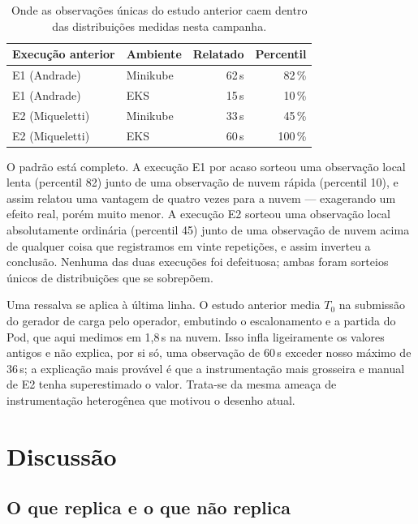 \documentclass[conference]{IEEEtran}
\begin{document}
\begin{table}[!t]
\centering
\caption{Onde as observações únicas do estudo anterior caem dentro das
distribuições medidas nesta campanha.}
\label{tab:percentis}
\footnotesize
\begin{tabular}{@{}llrr@{}}
\toprule
\textbf{Execução anterior} & \textbf{Ambiente} & \textbf{Relatado} & \textbf{Percentil}\\
\midrule
E1 (Andrade)    & Minikube & 62\,s & 82\,\%\\
E1 (Andrade)    & EKS      & 15\,s & 10\,\%\\
E2 (Miqueletti) & Minikube & 33\,s & 45\,\%\\
E2 (Miqueletti) & EKS      & 60\,s & 100\,\%\\
\bottomrule
\end{tabular}
\end{table}

O padrão está completo. A execução E1 por acaso sorteou uma observação local
lenta (percentil 82) junto de uma observação de nuvem rápida (percentil 10), e
assim relatou uma vantagem de quatro vezes para a nuvem --- exagerando um efeito
real, porém muito menor. A execução E2 sorteou uma observação local absolutamente
ordinária (percentil 45) junto de uma observação de nuvem acima de qualquer coisa
que registramos em vinte repetições, e assim inverteu a conclusão. Nenhuma das
duas execuções foi defeituosa; ambas foram sorteios únicos de distribuições que
se sobrepõem.

Uma ressalva se aplica à última linha. O estudo anterior media $T_0$ na submissão
do gerador de carga pelo operador, embutindo o escalonamento e a partida do Pod,
que aqui medimos em 1,8\,s na nuvem. Isso infla ligeiramente os valores antigos e
não explica, por si só, uma observação de 60\,s exceder nosso máximo de 36\,s; a
explicação mais provável é que a instrumentação mais grosseira e manual de E2
tenha superestimado o valor. Trata-se da mesma ameaça de instrumentação
heterogênea que motivou o desenho atual.

\section{Discussão}
\label{sec:discussao}

\subsection{O que replica e o que não replica}
\end{document}

